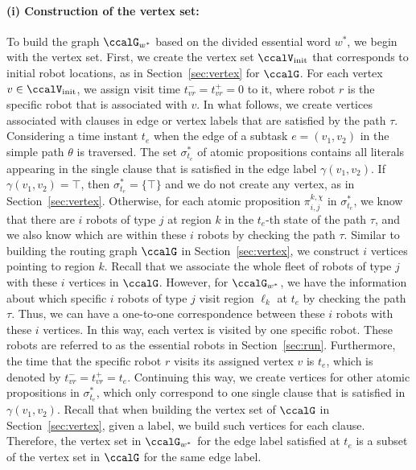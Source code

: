 \documentclass[Afour,sageh,times]{sagej}
\renewcommand{\ap}[3]{\mathcal{\pi}_{{#1},{#2}}^{#3}}
\begin{document}
{{\paragraph{(i) Construction of the vertex set:}\label{app:vertex} To build the graph $\ccalG_{w^*}$ based on the divided  essential word  $w^*$, we begin with the vertex set. First, we create the vertex set $\ccalV_{\text{init}}$ that corresponds to initial robot locations, as in Section~\ref{sec:vertex} for $\ccalG$. For each vertex $v \in \ccalV_{\text{init}}$, we assign visit time $t_{vr}^- = t_{vr}^+ = 0$ to it,  where robot $r$ is the specific robot that is associated with $v$. In what follows, we create vertices associated with clauses in edge or vertex labels that are satisfied by the path $\tau$. Considering a time instant $t_e$ when the edge of a subtask  $e = (v_1, v_2)$ in the simple path $\theta$ is traversed. The set $\sigma_{t_e}^*$ of atomic propositions  contains all literals appearing in the single clause that is satisfied in the edge label $\gamma(v_1, v_2)$. If $\gamma(v_1, v_2) = \top$, then $\sigma_{t_e}^* = \{\top\}$ and we do not create any vertex, as in Section~\ref{sec:vertex}. Otherwise, for each atomic proposition $\ap{i}{j}{k,\chi}$ in $\sigma_{t_e}^*$, we know that there are $i$ robots of type $j$ at region $k$ in the $t_e$-th state of the path $\tau$, and we also know which are within these $i$ robots by checking the path $\tau$. Similar to building the routing graph $\ccalG$ in Section~\ref{sec:vertex}, we construct $i$ vertices pointing to region $k$. Recall that we associate the whole fleet of robots of type $j$ with these $i$ vertices in $\ccalG$. However, for $\ccalG_{w^*}$, we have the information about which specific $i$ robots of type $j$ visit region $\ell_k$ at $t_e$ by checking the path $\tau$. Thus, we can have a one-to-one correspondence between these $i$ robots with these $i$ vertices. In this way, each vertex is visited by one specific robot. These robots are referred to as the essential robots in Section~\ref{sec:run}. Furthermore, the time that the specific  robot $r$ visits its assigned vertex $v$ is $t_e$, which is denoted by $t_{vr}^- = t_{vr}^+ = t_e$. Continuing this way, we create vertices for other atomic propositions in $\sigma_{t_e}^*$, which only correspond to one single clause that is satisfied in $\gamma(v_1, v_2)$. Recall that when building the vertex set of $\ccalG$ in Section~\ref{sec:vertex}, given a label, we build such vertices for each clause. Therefore, the vertex set in $\ccalG_{w^*}$ for the edge label satisfied at $t_e$ is a subset of the vertex set in $\ccalG$ for the same edge label.

}}
\end{document}
